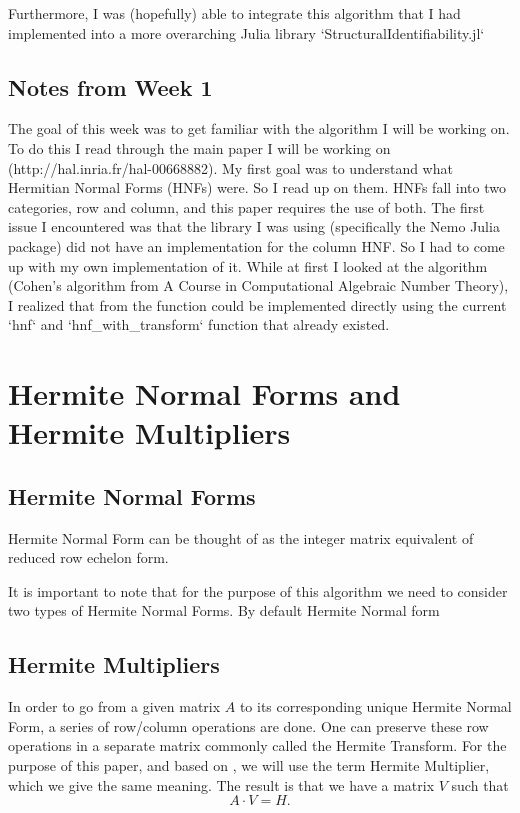 \documentclass[oneside, a4paper, onecolumn, 11pt]{article}
\begin{document}
Furthermore, I was (hopefully) able to integrate this algorithm that I had implemented into a more overarching Julia library `StructuralIdentifiability.jl`

\subsection*{Notes from Week 1}

The goal of this week was to get familiar with the algorithm I will be working on. To do this I read through the main paper I will be working on (http://hal.inria.fr/hal-00668882). My first goal was to understand what Hermitian Normal Forms (HNFs) were. So I read up on them. HNFs fall into two categories, row and column, and this paper requires the use of both. The first issue I encountered was that the library I was using (specifically the Nemo Julia package) did not have an implementation for the column HNF. So I had to come up with my own implementation of it. While at first I looked at the algorithm (Cohen's algorithm from A Course in Computational Algebraic Number Theory), I realized that from the function could be implemented directly using the current `hnf` and `hnf\_with\_transform` function that already existed.

\section{Hermite Normal Forms and Hermite Multipliers}

\subsection{Hermite Normal Forms}

Hermite Normal Form can be thought of as the integer matrix equivalent of reduced row echelon form.

It is important to note that for the purpose of this algorithm we need to consider two types of Hermite Normal Forms. By default Hermite Normal form

\subsection{Hermite Multipliers}

In order to go from a given matrix \(A\) to its corresponding unique Hermite Normal Form, a series of row/column operations are done. One can preserve these row operations in a separate matrix commonly called the Hermite Transform. For the purpose of this paper, and based on \cite{Hubert2013}, we will use the term Hermite Multiplier, which we give the same meaning. The result is that we have a matrix \(V\) such that
\[A \cdot V = H.\]
\end{document}
